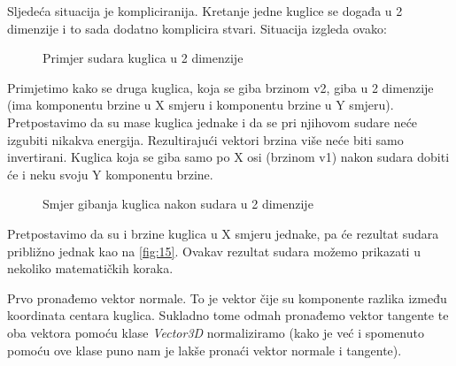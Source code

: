 Sljedeća situacija je kompliciranija. Kretanje jedne kuglice se događa u 2 dimenzije i to sada dodatno komplicira stvari. Situacija izgleda ovako:
\begin{figure}[!http]
	\begin{center}
	\end{center}
	\caption {Primjer sudara kuglica u 2 dimenzije}
	\label{fig:16}
\end{figure}
Primjetimo kako se druga kuglica, koja se giba brzinom v2, giba u 2 dimenzije (ima komponentu brzine u X smjeru i komponentu brzine u Y smjeru). Pretpostavimo da su mase kuglica jednake i da se pri njihovom sudare neće izgubiti nikakva energija. Rezultirajući vektori brzina više neće biti samo invertirani. Kuglica koja se giba samo po X osi (brzinom v1) nakon sudara dobiti će i neku svoju Y komponentu brzine.
\begin{figure}[!http]
	\begin{center}
	\end{center}
	\caption {Smjer gibanja kuglica nakon sudara u 2 dimenzije}
	\label{fig:17}
\end{figure}
Pretpostavimo da su i brzine kuglica u X smjeru jednake, pa će rezultat sudara približno jednak kao na \ref{fig:15}. Ovakav rezultat sudara možemo prikazati u nekoliko matematičkih koraka\cite{2}.

Prvo pronađemo vektor normale. To je vektor čije su komponente razlika između koordinata centara kuglica. Sukladno tome odmah pronađemo vektor tangente te oba vektora pomoću klase \emph{Vector3D} normaliziramo (kako je već i spomenuto pomoću ove klase puno nam je lakše pronaći vektor normale i tangente)\cite{2}.

